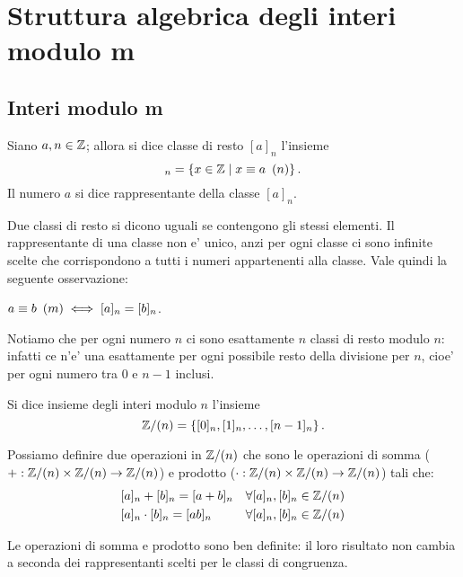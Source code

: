 \section{Struttura algebrica degli interi modulo m}

\subsection{Interi modulo m}

\begin{definition}
    Siano $a, n \in \mathbb{Z}$; allora si dice classe di resto $[a]_n$ l'insieme 
    \begin{equation}
        [a]_n = \left\{x \in \Z \mid x \equiv a \Mod{n}\right\}.
    \end{equation}
    Il numero $a$ si dice rappresentante della classe $[a]_n$.
\end{definition}

Due classi di resto si dicono uguali se contengono gli stessi elementi.
Il rappresentante di una classe non e' unico, anzi per ogni classe ci sono infinite scelte che corrispondono a tutti i numeri appartenenti alla classe. Vale quindi la seguente osservazione:
\begin{remark}
    $a \equiv b \ \left(m\right) \iff [a]_n = [b]_n$.
\end{remark}

Notiamo che per ogni numero $n$ ci sono esattamente $n$ classi di resto modulo $n$: infatti ce n'e' una esattamente per ogni possibile resto della divisione per $n$, cioe' per ogni numero tra $0$ e $n-1$ inclusi.

\begin{definition}
    Si dice insieme degli interi modulo $n$ l'insieme
    \begin{equation}
        \mathbb{Z}/(n) = \left\{ [0]_n, [1]_n, \dots, [n-1]_n\right\}.
    \end{equation}
\end{definition}

Possiamo definire due operazioni in $\mathbb{Z}/(n)$ che sono le operazioni di somma ($+ : \mathbb{Z}/(n) \times \mathbb{Z}/(n) \to \mathbb{Z}/(n)$) e prodotto ($\cdot : \mathbb{Z}/(n) \times \mathbb{Z}/(n) \to \mathbb{Z}/(n)$) tali che:
\begin{align}
    &[a]_n + [b]_n = [a+b]_n    &\forall [a]_n, [b]_n \in \mathbb{Z}/(n)\\
    &[a]_n \cdot [b]_n = [ab]_n &\forall [a]_n, [b]_n \in \mathbb{Z}/(n)
\end{align}

\begin{remark}
    Le operazioni di somma e prodotto sono ben definite: il loro risultato non cambia a seconda dei rappresentanti scelti per le classi di congruenza.
\end{remark}

